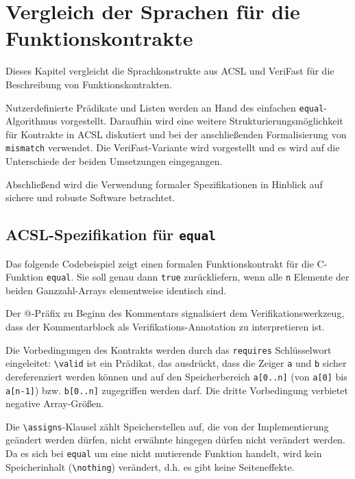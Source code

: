 ﻿\chapter{Vergleich der Sprachen für die Funktionskontrakte}
\label{sec:design-by-contract}

Dieses Kapitel vergleicht die Sprachkonstrukte aus ACSL und VeriFast für die Beschreibung von Funktionskontrakten.

Nutzerdefinierte Prädikate und Listen werden an Hand des einfachen \texttt{equal}-Algorithmus vorgestellt.
Daraufhin wird eine weitere Strukturierungsmöglichkeit für Kontrakte in ACSL diskutiert und bei der anschließenden
Formalisierung von \texttt{mismatch} verwendet. Die VeriFast-Variante wird vorgestellt und es wird auf die Unterschiede
der beiden Umsetzungen eingegangen. 

Abschließend wird die Verwendung formaler Spezifikationen in Hinblick auf sichere und robuste Software betrachtet.


\section{ACSL-Spezifikation für \texttt{equal}}
\label{sec:design-by-contract:acsl-spezifikation}

Das folgende Codebeispiel zeigt einen formalen Funktionskontrakt für die C-Funktion \texttt{equal}. Sie soll
genau dann \lstinline{true} zurückliefern, wenn alle \lstinline{n} Elemente der beiden Ganzzahl-Arrays elementweise identisch sind.



Der @-Präfix zu Beginn des Kommentars signalisiert dem Verifikationswerkzeug, 
dass der Kommentarblock als Verifikations-Annotation zu interpretieren ist. 

Die Vorbedingungen des Kontrakts werden durch das \lstinline{requires} Schlüsselwort eingeleitet: \lstinline{\valid} ist ein Prädikat, 
das ausdrückt, dass die Zeiger \lstinline{a} und \lstinline{b} sicher dereferenziert werden können und auf den Speicherbereich \lstinline{a[0..n]} 
(von \lstinline{a[0]} bis \lstinline{a[n-1]}) bzw. \lstinline{b[0..n]} zugegriffen werden darf. Die dritte Vorbedingung verbietet 
negative Array-Größen.

Die \lstinline{\assigns}-Klausel zählt Speicherstellen auf, die von der Implementierung geändert werden dürfen, nicht erwähnte
hingegen dürfen nicht verändert werden. Da es sich bei \texttt{equal} um eine nicht mutierende Funktion handelt, wird kein 
Speicherinhalt (\lstinline{\nothing}) verändert, d.h. es gibt keine Seiteneffekte.


